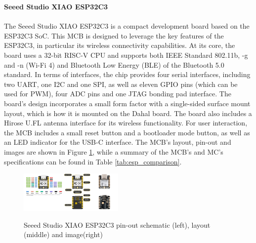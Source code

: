 \textbf{Seeed Studio XIAO ESP32C3}\\\\
The Seeed Studio XIAO ESP32C3 is a compact development board based on the ESP32C3 SoC. This MCB is designed to leverage the key features of the ESP32C3, in particular its wireless connectivity capabilities. At its core, the board uses a 32-bit RISC-V CPU and supports both IEEE Standard 802.11b, -g and -n (Wi-Fi 4) and Bluetooth Low Energy (BLE) of the Bluetooth 5.0 standard. 
In terms of interfaces, the chip provides four serial interfaces, including two UART, one I2C and one SPI, as well as eleven GPIO pins (which can be used for PWM), four ADC pins and one JTAG bonding pad interface. 
The board's design incorporates a small form factor with a single-sided surface mount layout, which is how it is mounted on the Dahal board. The board also includes a Hirose U.FL antenna interface for its wireless functionality. For user interaction, the MCB includes a small reset button and a bootloader mode button, as well as an LED indicator for the USB-C interface. The MCB's layout, pin-out and images are shown in Figure \ref{fig:esp32c3}, while a summary of the MCB's and MC's specifications can be found in Table \ref{tab:esp_comparison}. \citep{espressif_systems_esp32-c3_2024, seeed_studio_seeed_2024-2}

\begin{figure}[H]
    \centering
    \includegraphics[width=0.45\textwidth]{overleaf/images/xiaoesp32c3.png}
    \\\vspace{\ftspace}
    \caption{Seeed Studio XIAO ESP32C3 pin-out schematic (left), layout (middle) and image(right) \citep[adapted from][]{seeed_studio_seeed_2024-2}}
    \label{fig:esp32c3}
\end{figure}

